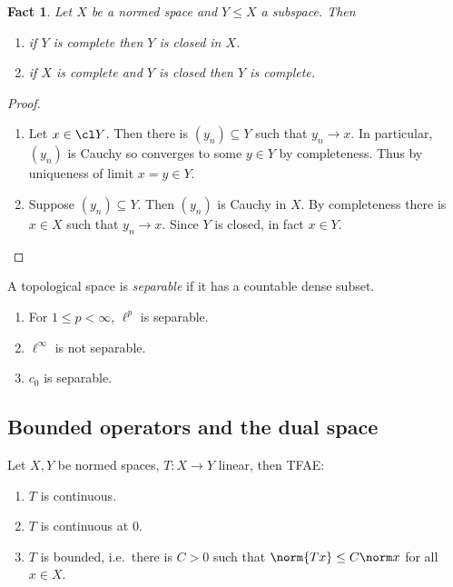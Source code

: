 \documentclass[a4paper]{article}
\newtheorem*{fact}{Fact}
\begin{document}
\begin{fact}
  Let \(X\) be a normed space and \(Y \leq X\) a subspace. Then
  \begin{enumerate}
  \item if \(Y\) is complete then \(Y\) is closed in \(X\).
  \item if \(X\) is complete and \(Y\) is closed then \(Y\) is complete.
  \end{enumerate}
\end{fact}

\begin{proof}\leavevmode
  \begin{enumerate}
  \item Let \(x \in \cl Y\). Then there is \((y_n) \subseteq Y\) such that \(y_n \to x\). In particular, \((y_n)\) is Cauchy so converges to some \(y \in Y\) by completeness. Thus by uniqueness of limit \(x = y \in Y\).
  \item Suppose \((y_n) \subseteq Y\). Then \((y_n)\) is Cauchy in \(X\). By completeness there is \(x \in X\) such that \(y_n \to x\). Since \(Y\) is closed, in fact \(x \in Y\).
  \end{enumerate}
\end{proof}

\begin{definition}[separable]
  A topological space is \emph{separable} if it has a countable dense subset.
\end{definition}

\begin{ex}\leavevmode
  \begin{enumerate}
  \item For \(1 \leq p < \infty\), \(\ell^p\) is separable.
  \item \(\ell^\infty\) is not separable.
  \item \(c_0\) is separable.
  \end{enumerate}
\end{ex}

\subsection{Bounded operators and the dual space}

\begin{proposition}
  Let \(X, Y\) be normed spaces, \(T: X \to Y\) linear, then TFAE:
  \begin{enumerate}
  \item \(T\) is continuous.
  \item \(T\) is continuous at \(0\).
  \item \(T\) is bounded, i.e.\ there is \(C > 0\) such that \(\norm{Tx} \leq C \norm x\) for all \(x \in X\).
  \end{enumerate}
\end{proposition}
\end{document}
